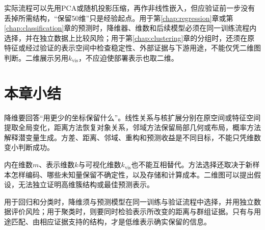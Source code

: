 实际流程可以先用PCA或随机投影压缩，再作非线性嵌入，但应验证前一步没有丢掉所需结构，“保留50维”只是经验起点。用于第\ref{chap:regression}章或第\ref{chap:classification}章的预测时，降维器、维数和后续模型必须在同一训练流程内选择，并在独立数据上比较风险；用于第\ref{chap:clustering}章的分组时，还须在原特征或经过验证的表示空间中检查稳定性、外部证据与下游用途，不能仅凭二维图判断。二维展示另用$k_{\mathrm{vis}}$，不应迫使部署表示也取二维。

\section{本章小结}
\label{sec:dim-summary}

降维要回答“用更少的坐标保留什么”。线性关系与核扩展分别在原空间或特征空间提取全局变化，距离方法恢复对象关系，邻域方法保留局部几何或布局，概率方法解释潜变量生成。方差、距离、邻域、重构和预测收益是不同目标，不能只凭维数变小判断成功。

内在维数$m$、表示维数$k$与可视化维数$k_{\mathrm{vis}}$也不能互相替代。方法选择还取决于新样本怎样编码、哪些未知量保留不确定性，以及存储和计算成本。二维图可以提出假设，无法独立证明高维簇结构或最佳预测表示。

用于回归和分类时，降维须与预测模型在同一训练与验证流程中选择，并用独立数据评价风险；用于聚类时，则要同时检验表示所改变的距离与群组证据。只有与用途匹配、由相应证据支持的结构，才是低维表示确实保留的信息。
